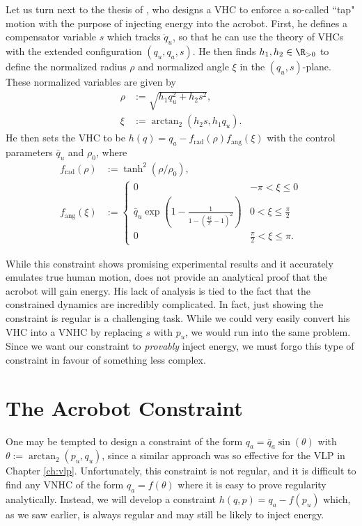 Let us turn next to the thesis of \citet{xingbo_thesis}, who designs a VHC to enforce a
so-called ``tap" motion with the purpose of injecting energy into the acrobot. 
First, he defines a compensator variable \(s\) which tracks \(\dot{q}_u\), so
that he can use the theory of VHCs with the extended configuration 
\((q_u,q_a,s)\).
He then finds \(h_1, h_2 \in \R_{>0}\) to define the
normalized radius \(\rho\) and normalized angle \(\xi\) in the
\((q_u, s)\)-plane.
These normalized variables are given by
\begin{align*}
    \rho &:= \sqrt{h_1 q_u^2 + h_2 s^2}
    , \\
    \xi &:= \arctan_2(h_2 s, h_1 q_u)
    . 
\end{align*}
He then sets the VHC to be \(h(q) = q_a - f_\text{rad}(\rho)f_\text{ang}(\xi)\)
with the control parameters \(\bar{q}_u\) and \(\rho_0\), where
\begin{align}
    \label{eqn:xingbo-frad}
    f_\text{rad}(\rho) &:= \tanh^2(\rho/\rho_0)
    , \\
    \label{eqn:xingbo-fang}
    f_\text{ang}(\xi) &:= 
    \begin{cases}
        0 & -\pi < \xi \leq 0 \\
        \bar{q}_u \exp\left(1 - \frac{1}{1-(\frac{4\xi}{\pi} - 1)^2}\right) 
          & 0 < \xi \leq \frac{\pi}{2} \\
        0 & \frac{\pi}{2} < \xi \leq \pi
        .
    \end{cases}
\end{align}

While this constraint shows promising experimental results and it accurately
emulates true human motion, \citeauthor{xingbo_thesis}
does not provide an analytical proof that the acrobot will gain energy.
His lack of analysis is tied to the fact that the constrained
dynamics are incredibly complicated.
In fact, just showing the constraint is regular is a challenging task.
While we could very easily convert his VHC into a VNHC by replacing \(s\) with
\(p_u\), we would run into the same problem. 
Since we want our constraint to \textit{provably} inject energy, we must forgo
this type of constraint in favour of something less complex.

\section{The Acrobot Constraint}
One may be tempted to design a constraint of the form \(q_a = \bar{q}_a\sin(\theta)\) 
with \(\theta := \arctan_2(p_u,q_u)\), since a similar approach 
was so effective for the VLP in Chapter \ref{ch:vlp}.
Unfortunately, this constraint is not regular, and it is difficult to find any
VNHC of the form \(q_a = f(\theta)\) where it is easy to prove regularity
analytically.
Instead, we will develop a constraint \(h(q,p) = q_a - f(p_u)\) which,
as we saw earlier, is always regular and may still be likely to inject energy.
 
